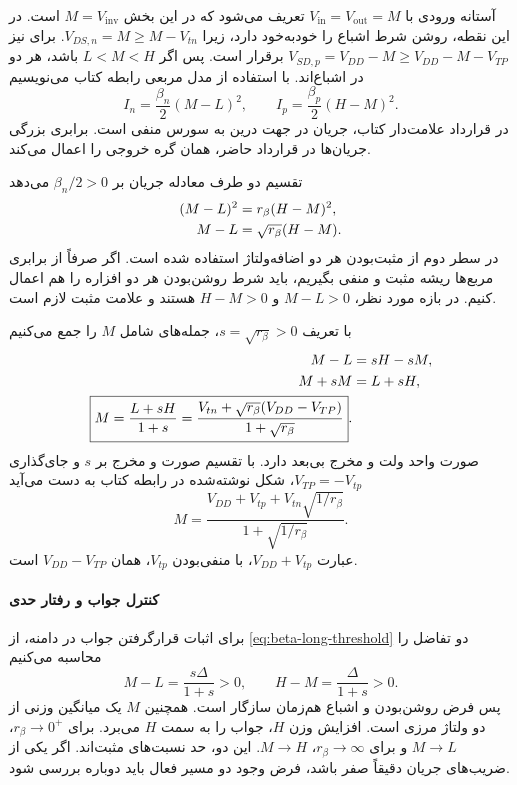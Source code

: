 آستانه ورودی با \(V_{\mathrm{in}}=V_{\mathrm{out}}=M\) تعریف
می‌شود که در این بخش \(M=V_{\mathrm{inv}}\) است.
در این نقطه،  روشن شرط اشباع را خودبه‌خود دارد، زیرا
\(V_{DS,n}=M\ge M-V_{tn}\). برای  نیز
\(V_{SD,p}=V_{DD}-M\ge V_{DD}-M-V_{TP}\) برقرار است.
پس اگر \(L<M<H\) باشد، هر دو در اشباع‌اند.
با استفاده از مدل مربعی رابطه  کتاب می‌نویسیم
\begin{equation}
 I_n=\frac{\beta_n}{2}(M-L)^2,\qquad
 I_p=\frac{\beta_p}{2}(H-M)^2.
 \label{eq:beta-long-currents}
\end{equation}
در قرارداد علامت‌دار کتاب، جریان  در جهت درین به
سورس منفی است. برابری بزرگی جریان‌ها در قرارداد حاضر، همان
 گره خروجی را اعمال می‌کند.

تقسیم دو طرف معادله جریان بر \(\beta_n/2>0\) می‌دهد
\begin{align}
 (M-L)^2&=r_\beta(H-M)^2,\notag\\
 M-L&=\sqrt{r_\beta}(H-M).
 \label{eq:beta-positive-root}
\end{align}
در سطر دوم از مثبت‌بودن هر دو اضافه‌ولتاژ استفاده شده است.
اگر صرفاً از برابری مربع‌ها ریشه مثبت و منفی بگیریم، باید شرط
روشن‌بودن هر دو افزاره را هم اعمال کنیم. در بازه مورد نظر،
\(M-L>0\) و \(H-M>0\) هستند و علامت مثبت لازم است.

با تعریف \(s=\sqrt{r_\beta}>0\)، جمله‌های شامل \(M\) را جمع می‌کنیم
\begin{align}
 M-L&=sH-sM,\notag\\
 M+sM&=L+sH,\notag\\
 \boxed{M=\frac{L+sH}{1+s}
 =\frac{V_{tn}+\sqrt{r_\beta}(V_{DD}-V_{TP})}
              {1+\sqrt{r_\beta}}}.
 \label{eq:beta-long-threshold}
\end{align}
صورت واحد ولت و مخرج بی‌بعد دارد. با تقسیم صورت و مخرج بر
\(s\) و جای‌گذاری \(V_{TP}=-V_{tp}\)، شکل نوشته‌شده در
رابطه  کتاب به دست می‌آید
\begin{equation}
 M=\frac{V_{DD}+V_{tp}+V_{tn}\sqrt{1/r_\beta}}
              {1+\sqrt{1/r_\beta}}.
 \label{eq:beta-book-long-form}
\end{equation}
عبارت \(V_{DD}+V_{tp}\)، با منفی‌بودن \(V_{tp}\)، همان
\(V_{DD}-V_{TP}\) است.

\paragraph*{کنترل جواب و رفتار حدی}
برای اثبات قرارگرفتن جواب در دامنه، از
\eqref{eq:beta-long-threshold} دو تفاضل را محاسبه می‌کنیم
\begin{equation}
 M-L=\frac{s\Delta}{1+s}>0,\qquad
 H-M=\frac{\Delta}{1+s}>0.
 \label{eq:beta-threshold-domain}
\end{equation}
پس فرض روشن‌بودن و اشباع هم‌زمان سازگار است. همچنین \(M\)
یک میانگین وزنی از دو ولتاژ مرزی است. افزایش وزن \(H\)، جواب
را به سمت \(H\) می‌برد. برای \(r_\beta\to0^+\)،
\(M\to L\) و برای \(r_\beta\to\infty\)، \(M\to H\).
این دو، حد نسبت‌های مثبت‌اند. اگر یکی از ضریب‌های جریان دقیقاً
صفر باشد، فرض وجود دو مسیر فعال باید دوباره بررسی شود.

